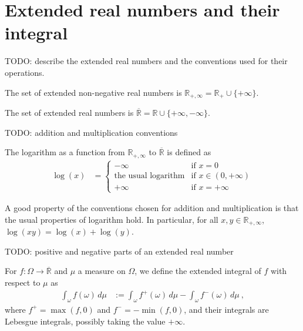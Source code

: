 \chapter{Extended real numbers and their integral}

TODO: describe the extended real numbers and the conventions used for their operations.

\begin{definition}\label{def:ENNReal}
  \mathlibok
The set of extended non-negative real numbers is $\mathbb{R}_{+,\infty} = \mathbb{R}_{+} \cup \{+\infty\}$.
\end{definition}

\begin{definition}\label{def:EReal}
  \mathlibok
The set of extended real numbers is $\overline{\mathbb{R}} = \mathbb{R} \cup \{+\infty, -\infty\}$.
\end{definition}

TODO: addition and multiplication conventions

\begin{definition}\label{def:ENNReal.log}
  \mathlibok
The logarithm as a function from $\mathbb{R}_{+, \infty}$ to $\overline{\mathbb{R}}$ is defined as
\begin{align*}
  \log(x)
  &= \begin{cases}
    -\infty & \text{if } x = 0 \\
    \text{the usual logarithm} & \text{if } x \in (0, +\infty) \\
    +\infty & \text{if } x = +\infty
  \end{cases}
\end{align*}
\end{definition}

A good property of the conventions chosen for addition and multiplication is that the usual properties of logarithm hold.
In particular, for all $x, y \in \mathbb{R}_{+, \infty}$, $\log(xy) = \log(x) + \log(y)$.

TODO: positive and negative parts of an extended real number

\begin{definition}\label{def:eintegral}
  \leanok
For $f : \Omega \to \overline{\mathbb{R}}$ and $\mu$ a measure on $\Omega$, we define the extended integral of $f$ with respect to $\mu$ as
\begin{align*}
  \int_{\omega} f (\omega) \, d\mu
  &:= \int_{\omega} f^{+} (\omega) \, d\mu - \int_{\omega} f^{-} (\omega) \, d\mu
  \: ,
\end{align*}
where $f^{+} = \max(f, 0)$ and $f^{-} = -\min(f, 0)$, and their integrals are Lebesgue integrals, possibly taking the value $+\infty$.
\end{definition}
